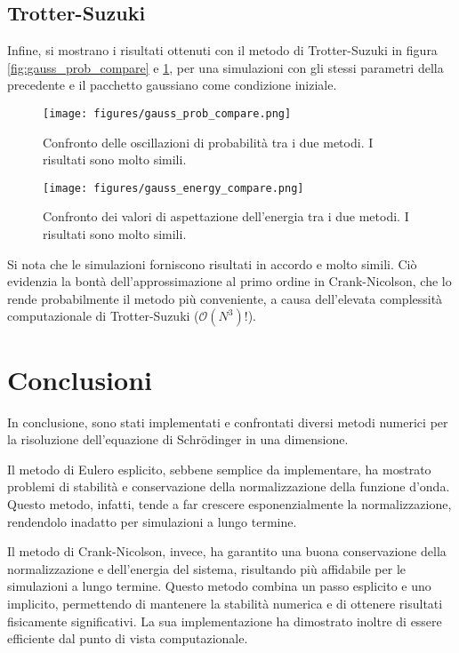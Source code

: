 \documentclass[a4paper, titlepage]{article}
\numberwithin{equation}{section}
\begin{document}
\subsection{Trotter-Suzuki}
Infine, si mostrano i risultati ottenuti con il metodo di Trotter-Suzuki in figura \ref{fig:gauss_prob_compare} e \ref{fig:gauss_energy_compare}, per una simulazioni con gli stessi parametri della precedente e il pacchetto gaussiano come condizione iniziale.
\begin{figure}[h!]
    \centering
    \begin{minipage}[t]{0.47 \textwidth}
        \centering
        \texttt{[image: figures/gauss\_prob\_compare.png]}
        \caption{Confronto delle oscillazioni di probabilità tra i due metodi. I risultati sono molto simili.}
        \label{fig:gauss_prob_compare}
    \end{minipage}
    \hspace{0.02\textwidth}
    \begin{minipage}[t]{0.47 \textwidth}
        \centering
        \texttt{[image: figures/gauss\_energy\_compare.png]}
        \caption{Confronto dei valori di aspettazione dell'energia tra i due metodi. I risultati sono molto simili.}
        \label{fig:gauss_energy_compare}
    \end{minipage}
\end{figure}
Si nota che le simulazioni forniscono risultati in accordo e molto simili. Ciò evidenzia la bontà dell'approssimazione al primo ordine in Crank-Nicolson, che lo rende probabilmente il metodo più conveniente, a causa dell'elevata complessità computazionale di Trotter-Suzuki ($\mathcal{O}(N^3)$!).


\section{Conclusioni}
In conclusione, sono stati implementati e confrontati diversi metodi numerici per la risoluzione dell'equazione di Schrödinger in una dimensione. 

Il metodo di Eulero esplicito, sebbene semplice da implementare, ha mostrato problemi di stabilità e conservazione della normalizzazione della funzione d'onda. Questo metodo, infatti, tende a far crescere esponenzialmente la normalizzazione, rendendolo inadatto per simulazioni a lungo termine.

Il metodo di Crank-Nicolson, invece, ha garantito una buona conservazione della normalizzazione e dell'energia del sistema, risultando più affidabile per le simulazioni a lungo termine. Questo metodo combina un passo esplicito e uno implicito, permettendo di mantenere la stabilità numerica e di ottenere risultati fisicamente significativi. La sua implementazione ha dimostrato inoltre di essere efficiente dal punto di vista computazionale.
\end{document}
